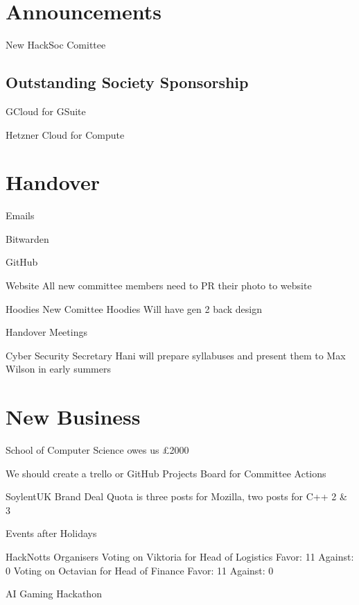 \documentclass[11pt,hacksoc]{meetingmins}
\begin{document}
\maketitle

\section{Announcements}
\begin{items}
  \item New HackSoc Comittee

\end{items}

\subsection{Outstanding Society Sponsorship}
\begin{hiddensubitems}
\item GCloud for GSuite
\item Hetzner Cloud for Compute
\end{hiddensubitems}

\section{Handover}
\begin{items}
\item Emails
\item Bitwarden
\item GitHub
\item Website
  \subitem All new committee members need to PR their photo to website
\item Hoodies 
  \subitem New Comittee Hoodies Will have gen 2 back design
\item Handover Meetings
\item Cyber Security Secretary
  \subitem Hani will prepare syllabuses and present them to Max Wilson in early summers
\end{items}

\section{New Business}
\begin{items}
\item School of Computer Science owes us \pounds2000
\item We should create a trello or GitHub Projects Board for Committee Actions
\item SoylentUK Brand Deal
  \subitem Quota is three posts for Mozilla, two posts for C++ 2 \& 3
\item Events after Holidays
\item HackNotts Organisers
  \subitem Voting on Viktoria for Head of Logistics
    \subsubitem Favor: 11
    \subsubitem Against: 0
  \subitem Voting on Octavian for Head of Finance
    \subsubitem Favor: 11
    \subsubitem Against: 0
\item AI Gaming Hackathon
\end{items}

\vspace{1em}
\nextmeeting{}
\end{document}
